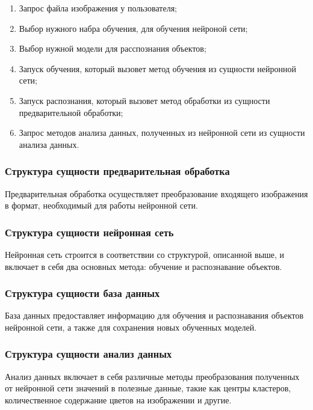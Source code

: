 \begin{enumerate}
\item Запрос файла изображения у пользователя;
\item Выбор нужного набра обучения, для обучения нейроной сети;
\item Выбор нужной модели для расспознания объектов;
\item Запуск обучения, который вызовет метод обучения из сущности нейронной сети;
\item Запуск распознания, который вызовет метод обработки из сущности предварительной обработки;
\item Запрос методов анализа данных, полученных из нейронной сети из сущности анализа данных.
\end{enumerate}

\subsubsection{Структура сущности предварительная обработка}
Предварительная обработка осуществляет преобразование входящего изображения в формат, необходимый для работы нейронной сети.

\subsubsection{Структура сущности нейронная сеть}
Нейронная сеть строится в соответствии со структурой, описанной выше, и включает в себя два основных метода: обучение и распознавание объектов.

\subsubsection{Структура сущности база данных}
База данных предоставляет информацию для обучения и распознавания объектов нейронной сети, а также для сохранения новых обученных моделей.

\subsubsection{Структура сущности анализ данных}
Анализ данных включает в себя различные методы преобразования полученных от нейронной сети значений в полезные данные, такие как центры кластеров, количественное содержание цветов на изображении и другие.